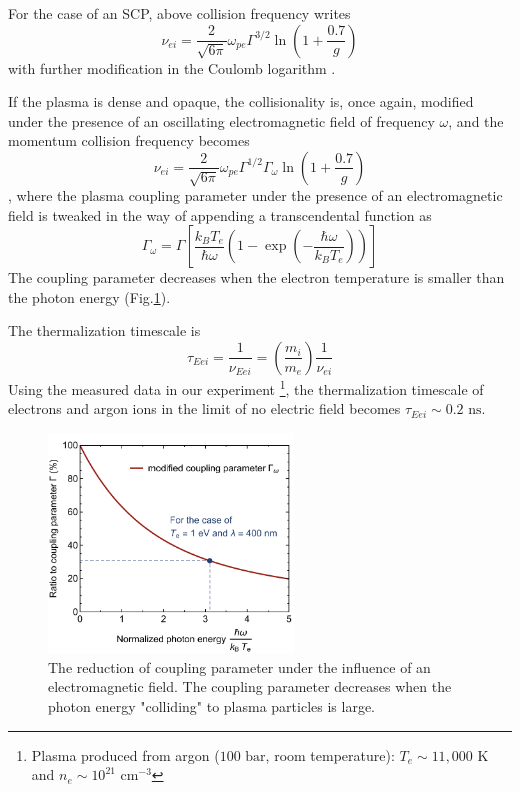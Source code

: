 For the case of an SCP, above collision frequency writes 
\begin{equation}
\nu_{ei} = \frac{2}{\sqrt{6\pi}} \omega_{pe} \Gamma^{3/2} \ln{ \left( 1+ \frac{0.7}{g} \right)}
\end{equation}
with further modification in the Coulomb logarithm \cite{dimonte2008molecular, bataller2014blackbody, zel2002physics}.

If the plasma is dense and opaque, the collisionality is, once again, modified under the presence of an oscillating electromagnetic field of frequency $\omega$, and the momentum collision frequency becomes
\begin{equation}
\nu_{ei} = \frac{2}{\sqrt{6\pi}} \omega_{pe} \Gamma^{1/2} \Gamma_\omega \ln{ \left( 1+ \frac{0.7}{g} \right)}
\end{equation}
, where the plasma coupling parameter under the presence of an electromagnetic field is tweaked in the way of appending a transcendental function as 
\begin{equation}
\Gamma_{\omega}=\Gamma\left[\frac{k_{B} T_e}{\hbar \omega}\left(1-\exp \left(-\frac{\hbar \omega}{k_{B} T_e}\right)\right)\right]
\end{equation}
The coupling parameter decreases when the electron temperature is smaller than the photon energy (Fig.\ref{fig:modifiedGamma}).

The thermalization timescale is
\begin{equation}
\tau_{Eei} = \frac{1}{\nu_{Eei}} = \left( \frac{m_i}{m_e} \right) \frac{1}{\nu_{ei}}
\end{equation}
Using the measured data in our experiment \footnote{Plasma produced from argon ($100 \text{ bar}$, room temperature): $T_e \sim 11,000 \text{ K}$ and $n_e \sim 10^{21} \text{ cm}^{-3}$}, the thermalization timescale of electrons and argon ions in the limit of no electric field becomes $\tau_{Eei} \sim 0.2 \text{ ns}$.

\begin{figure}[ht!]
\centering
\includegraphics[width=65mm]{figures/ch3/modified/modifiedGamma.pdf}
\caption{The reduction of coupling parameter under the influence of an electromagnetic field. The coupling parameter decreases when the photon energy "colliding" to plasma particles is large.}
\label{fig:modifiedGamma}
\end{figure}



